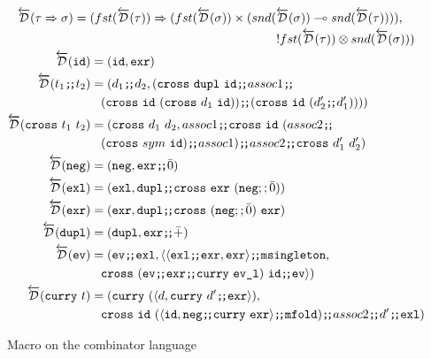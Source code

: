   \begin{figure}
    \centering
    \begin{gather*}
      \begin{multlined}
        \Drev(\tau \synFunc \sigma) =
          (fst(\Drev(\tau)) \synFunc
            (fst(\Drev(\sigma)) \synStar
              (snd(\Drev(\sigma)) \synLin snd(\Drev(\tau)))),
          \\ \synTens{fst(\Drev(\tau))}{snd(\Drev(\sigma))})
      \end{multlined} \\
      \begin{aligned}
        \Drev(\synId) &= (\synId, \synExr) \\
        \Drev(\synSeq{t_1}{t_2}) &= (\synSeq{d_1}{d_2},
        (\synSeq{\synSeq{\synSeq{\synCross{\synDupl}{\synId}}{assoc1}}{
          \\&\;\;\; (\synCross{\synId}{(\synCross{d_1}{\synId})})}}{
          (\synCross{\synId}{(\synSeq{d_2'}{d_1'})})})) \\
        \Drev(\synCross{t_1}{t_2}) &= (\synCross{d_1}{d_2},
          \synSeq{assoc1}{
            \synSeq{\synCross{\synId}{(
              \synSeq{assoc2}{
                \synSeq{\\&\;\;\;(\synCross{sym}{\synId})}{assoc1}})}}{
                  \synSeq{assoc2}{\synCross{d_1'}{d_2'}}}}) \\
        \Drev(\synNeg) &= (\synNeg, \synSeq{\synExr}{\synO}) \\
        \Drev(\synExl) &= (\synExl, \synSeq{\synDupl}{\synCross{\synExr}{(\synNeg ;; \synO)}}) \\
        \Drev(\synExr) &= (\synExr, \synSeq{\synDupl}{\synCross{(\synNeg ;; \synO)}{\synExr}}) \\
        \Drev(\synDupl) &= (\synDupl, \synSeq{\synExr}{\synP}) \\
        \Drev(\synEv) &= (\synSeq{\synEv}{\synExl}, \langle \synSeq{\langle \synSeq{\synExl}{\synExr}, \synExr \rangle}{\synMsingleton},
          \\&\;\;\; \synSeq{\synCross{(\synSeq{\synEv}{
            \synSeq{\synExr}{\synCurry{\synEvL}}})}{\synId}}{\synEv} \rangle) \\
        \Drev(\synCurry{t}) &= (\synCurry (\langle d, \synSeq{\synCurry{d'}}{\synExr} \rangle),
        \\&\;\;\; \synSeq{\synCross{\synId}{(\synSeq{\langle \synId, \synSeq{\synNeg}{\synCurry{\synExr}}\rangle}{\synMfold})}}
          {\synSeq{assoc2}{\synSeq{d'}{\synExl}}})
      \end{aligned}
    \end{gather*}
    \caption{Macro on the combinator language}
    \label{fig:macro_combinator}
  \end{figure}
